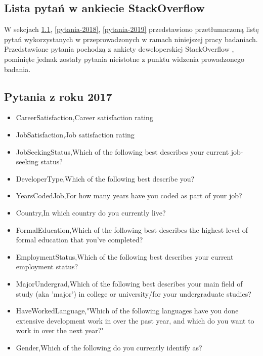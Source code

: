 
\appendix
\begin{appendices}
    \chapter{Lista pytań w ankiecie StackOverflow}\label{app:dod1}

    W sekcjach \ref{pytania-2017}, \ref{pytania-2018}, \ref{pytania-2019} przedstawiono przetłumaczoną listę pytań wykorzystanych w przeprowadzonych w ramach niniejszej pracy badaniach.
    Przedstawione pytania pochodzą z ankiety deweloperskiej StackOverflow \cite{so-survey-info}, pominięte jednak zostały pytania nieistotne z punktu widzenia prowadzonego badania.

    \section{Pytania z roku 2017}\label{pytania-2017}
    \begin{itemize}
        \item CareerSatisfaction,Career satisfaction rating
        \item JobSatisfaction,Job satisfaction rating
        \item JobSeekingStatus,Which of the following best describes your current job-seeking status?
        \item DeveloperType,Which of the following best describe you?
        \item YearsCodedJob,For how many years have you coded as part of your job?
        \item Country,In which country do you currently live?
        \item FormalEducation,Which of the following best describes the highest level of formal education that you've completed?
        \item EmploymentStatus,Which of the following best describes your current employment status?
        \item MajorUndergrad,Which of the following best describes your main field of study (aka 'major') in college or university/for your undergraduate studies?
        \item HaveWorkedLanguage,"Which of the following languages have you done extensive development work in over the past year, and which do you want to work in over the next year?"
        \item Gender,Which of the following do you currently identify as?

\end{itemize}
\end{appendices}
